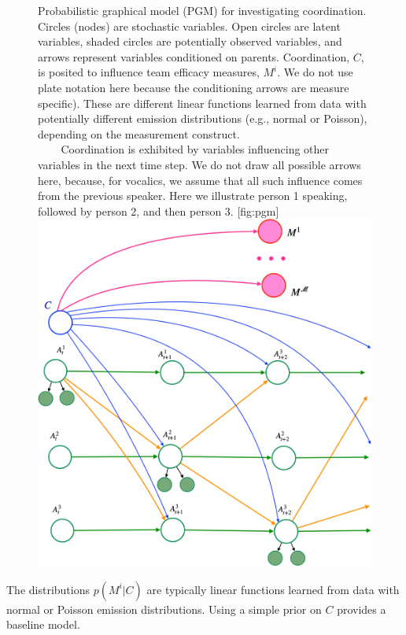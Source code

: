 %
    \begin{figure}
        \begin{sidecaption}{%
            Probabilistic graphical model (PGM) for investigating coordination.
            Circles (nodes) are stochastic variables.  Open circles are latent
            variables, shaded circles are potentially observed variables, and
            arrows represent variables conditioned on parents.  Coordination,
            $C$, is posited to influence team efficacy measures, $M^i$.  We do
            not use plate notation here because the conditioning arrows are
            measure specific). These are different linear functions learned
            from data with potentially different emission distributions (e.g.,
            normal or Poisson), depending on the measurement construct. \\
            $~~~~~~~~$ Coordination is exhibited by variables influencing other
            variables in the next time step. We do not draw all possible arrows
            here, because, for vocalics, we assume that all  such influence
            comes from the previous speaker.  Here we illustrate person 1
            speaking, followed by person 2, and then person 3.
        }[fig:pgm]
        \includegraphics[width=\textwidth]{images/prereg-pgm.pdf}
        \end{sidecaption}
    \end{figure}
%
    The distributions $p(M^i|C)$ are typically linear functions learned from data
    with normal or Poisson emission distributions. Using a simple prior on $C$
    provides a baseline model.

